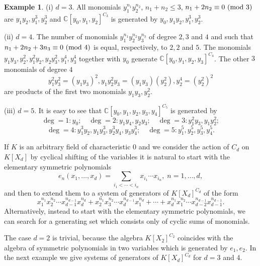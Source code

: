 \documentclass{amsart}
\theoremstyle{definition}
\newtheorem{example}[theorem]{Example}
\begin{document}
\begin{example}\label{invariants with diagonal action}
(i) $d=3$. All monomials $y_1^{n_1}y_2^{n_2}$, $n_1+n_2\leq 3$, $n_1+2n_2 \equiv 0 \text{ \rm (mod }3)$ are
$y_1y_2,y_1^3,y_2^3$ and ${\mathbb C}[y_0,y_1,y_2]^{C_3}$ is generated by $y_0,y_1y_2,y_1^3,y_2^3$.

(ii) $d=4$. The number of monomials $y_1^{n_1}y_2^{n_2}y_3^{n_3}$ of degree $2,3$ and $4$ and
such that $n_1+2n_2+3n_3 \equiv 0 \text{ \rm (mod }4)$ is equal, respectively, to $2, 2$ and $5$.
The monomials $y_1y_3,y_2^2,y_1^2y_2,y_2y_3^2,y_1^4,y_3^4$ together with $y_0$ generate
${\mathbb C}[y_0,y_1,y_2,y_3]^{C_4}$. The other $3$ monomials of degree $4$
\[
y_1^2y_3^2=(y_1y_3)^2,y_1y_2^2y_3=(y_1y_3)(y_2^2), y_2^4=(y_2^2)^2
\]
are products of the first two monomials $y_1y_3,y_2^2$.

(iii) $d=5$. It is easy to see that ${\mathbb C}[y_0,y_1,y_2,y_3,y_4]^{C_5}$ is generated by
\[
\deg=1:y_0;\quad\deg=2:y_1y_4,y_2y_3;\quad\deg=3:y_1^2y_3,y_1y_2^2;
\]
\[
\deg=4:y_1^3y_2,y_1y_3^3,y_2^3y_4,y_3y_4^3;\quad\deg=5:y_1^5,y_2^5,y_3^5,y_4^5.
\]
\end{example}

If $K$ is an arbitrary field of characteristic 0 and we consider the action of $C_d$ on $K[X_d]$
by cyclical shifting of the variables it is natural to start with the elementary symmetric polynomials
\[
e_n(x_1,\ldots,x_d)=\sum_{i_1<\cdots<i_n} x_{i_1}\cdots x_{i_n},\;n=1,\ldots,d,
\]
and then to extend them to a system of generators of $K[X_d]^{C_d}$ of the form
\[
x_1^{n_1}x_2^{n_2}\cdots x_{d-1}^{n_{d-1}}x_d^{n_d}+x_2^{n_1}x_3^{n_2}\cdots x_d^{n_{d-1}}x_1^{n_d}+\cdots+x_d^{n_1}x_1^{n_2}\cdots x_{d-2}^{n_{d-1}}x_{d-1}^{n_{d-1}}.
\]
Alternatively, instead to start with the elementary symmetric polynomials, we can search for a generating set which consists only of cyclic sums of monomials.

The case $d=2$ is trivial, because the algebra $K[X_2]^{C_2}$ coincides with the algebra of symmetric polynomials in two variables which is generated by $e_1,e_2$.
In the next example we give systems of generators of $K[X_d]^{C_d}$ for $d=3$ and 4.
\end{document}
